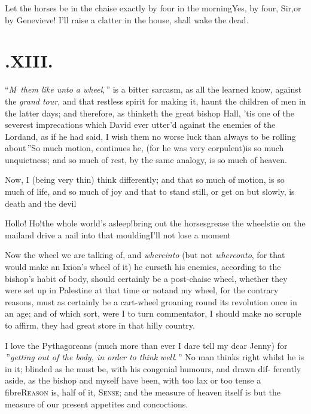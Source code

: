 \documentclass{article}
\begin{document}
Let the horses be in the chaise exactly by four in the
morning\tsh Yes, by four, Sir,\tsh or by
Genevieve! I’ll raise a clatter in the house, shall
wake the dead.

\vfill{}\eject
\section{.\enspace XIII.}

\lettrine{\lower-10pt\hbox{\large“}\textit{M}}{\,\itshape{}} 
\textit{them like unto a wheel},\,”\break
is a bitter sarcasm, as all the\break
learned know, against the \textit{grand tour}, 
and that restless spirit for making it,\break
{}\break haunt the
children of men in the latter days; and therefore, as thinketh the great bishop
Hall, ’tis one of the se\-ver\-est imprecations which
David ever utter’d against the enemies of the
Lord\tsk and, as if he had said, \lqq I wish them no\break
\lqq worse luck than always to be rolling\break
\lqq about\,”\tsk So much
motion, continues he, (for he was very corpulent)\tsk is so much
unquietness; and so much of rest, by the same analogy, is so much
of heaven.

Now, I (being very thin) think differently; and that so much of
motion, is so much of life, and so much of joy\break
\tsh and
that to stand still, or get on but slowly, is death and the
devil\tsh

Hollo! Ho!\tsh the whole world’s
asleep!\tsh bring out the horses\tsh grease the
wheels\tsh tie on the mail\tsh and drive a nail
into that moulding\tsh I’ll not lose a
moment\tsh

Now the wheel we are talking of, and \textit{whereinto} (but not
\textit{whereonto}, for that would make an Ixion’s wheel of it)
he curseth his enemies, according to the
bishop’s habit of body, should certainly be a post-chaise wheel, whether they were
set up in Palestine at that time or not\tsh and my wheel, for the contrary reasons,
must as certainly be a cart-wheel groaning round its revolution once in an age; and
of which sort, were I to turn commentator, I should make no scruple to affirm, they
had great store in that hilly country.

I love the Pythagoreans (much more than ever I dare tell my dear Jenny) for\break
{}\break
{}\,”\tsh [their] \lqq \textit{getting}\break
\lqq \textit{out of the body, in order to think}\break
\lqq \textit{well}.\,” No man thinks right whilst he is in it; blinded as
he must be, with his congenial humours, and drawn dif- ferently aside, as the bishop
and myself have been, with too lax or too tense a fibre\tsh \textsc{Reason} is,
half of it, \textsc{Sense}; and the measure of heaven itself is but the measure of
our present appetites and concoctions.\tsh
\end{document}
